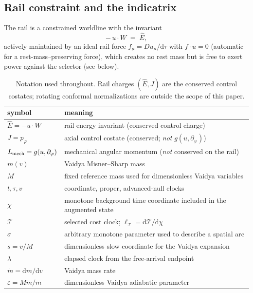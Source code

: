 \documentclass[12pt]{iopart}
\newcommand{\Ehat}{\hat E}
\newcommand{\dd}{\mathrm{d}}
\theoremstyle{plain}
\theoremstyle{definition}
\theoremstyle{plain}
\theoremstyle{remark}
\begin{document}
\subsection{Rail constraint and the indicatrix}
\label{sec:indicatrix}
The rail is a constrained worldline with the invariant
\begin{equation}
    -\,u\cdot W \;=\; \Ehat ,
    \label{eq:rail}
\end{equation}
actively maintained by an ideal rail force $f_\mu=Du_\mu/\dd\tau$ with
$f\cdot u=0$ (automatic for a rest-mass--preserving force), which creates no rest
mass but is free to exert power against the selector (see below).

\begin{table}[htbp]
    \centering\small
    \caption{Notation used throughout. Rail charges $(\Ehat,J)$ are the conserved control
    costates; rotating conformal normalizations are outside the scope of this paper.}
    \label{tab:notation}
    \begin{tabular}{@{}ll@{}}
        \hline\hline
        symbol & meaning\\
        \hline
        $\Ehat=-u\cdot W$ & rail energy invariant (conserved control charge)\\
        $J=p_\varphi$ & axial control costate (conserved; \emph{not} $g(u,\partial_\varphi)$)\\
        $L_{\rm mech}=g(u,\partial_\varphi)$ & mechanical angular momentum (\emph{not} conserved on the rail)\\
        $m(v)$ & Vaidya Misner--Sharp mass\\
        $M$ & fixed reference mass used for dimensionless Vaidya variables\\
        $t,\tau,v$ & coordinate, proper, advanced-null clocks\\
        $\chi$ & monotone background time coordinate included in the augmented state\\
        $\mathcal T$ & selected cost clock; $\ell_{\mathcal T}=\dd\mathcal T/\dd\chi$\\
        $\sigma$ & arbitrary monotone parameter used to describe a spatial arc\\
        $s=v/M$ & dimensionless slow coordinate for the Vaidya expansion\\
        $\lambda$ & elapsed clock from the free-arrival endpoint\\
        $\dot m=\dd m/\dd v$ & Vaidya mass rate\\
        $\varepsilon=M\dot m/m$ & dimensionless Vaidya adiabatic parameter\\
        \hline\hline
    \end{tabular}
\end{table}
\end{document}
